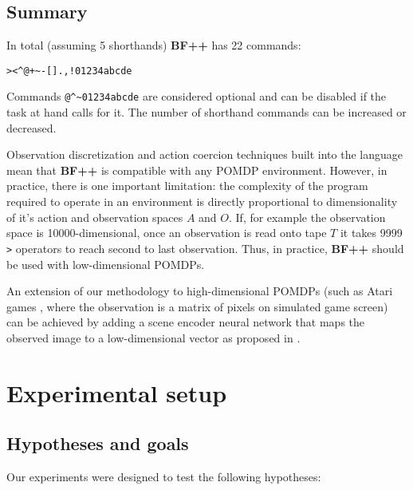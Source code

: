 \subsection{Summary}
\label{sec:summary}

In total (assuming 5 shorthands) \textbf{BF++} has 22 commands:

\begin{center}
\begin{lstlisting}
><^@+~-[].,!01234abcde
\end{lstlisting}
\end{center}

Commands \verb|@^~01234abcde| are considered optional and can be disabled if the task at hand calls for it.
The number of shorthand commands can be increased or decreased.

Observation discretization and action coercion techniques built into the language mean that \textbf{BF++} is compatible with any POMDP environment. 
However, in practice, there is one important limitation: the complexity of the program required to operate in an environment is directly proportional to dimensionality of it's action and observation spaces $A$ and $O$. 
If, for example the observation space is 10000-dimensional, once an observation is read onto tape $T$ it takes 9999 \verb|>| operators to reach second to last observation.
Thus, in practice, \textbf{BF++} should be used with low-dimensional POMDPs.

An extension of our methodology to high-dimensional POMDPs (such as Atari games \cite{atari}, where the observation is a matrix of pixels on simulated game screen) can be achieved by adding a scene encoder neural network that maps the observed image to a low-dimensional vector as proposed in \cite{daqn}.


\section{Experimental setup}
\label{sec:experiments}

\subsection{Hypotheses and goals}
\label{sec:exgoals}

Our experiments were designed to test the following hypotheses:

